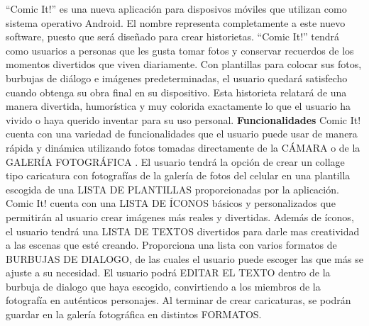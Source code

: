 \documentclass[12pt]{report}
\begin{document}
``Comic It!'' es una nueva aplicación para disposivos móviles que utilizan como sistema operativo Android. El nombre representa completamente a este nuevo software, puesto que será diseñado para crear historietas.
\newline
\newline
``Comic It!'' tendrá como usuarios a personas que les gusta tomar fotos y conservar recuerdos de los momentos divertidos que viven diariamente.
\newline
\newline
Con plantillas para colocar sus fotos, burbujas de diálogo e imágenes predeterminadas, el usuario quedará satisfecho cuando obtenga su obra final en su dispositivo.
\newline
\newline
Esta historieta relatará de una manera divertida, humorística y muy colorida exactamente lo que el usuario ha vivido o haya querido inventar para su uso personal.
	\newline
	\newline
	\newline
	\begingroup
		\large{
			\textbf{
				Funcionalidades
				\newline
				\newline
			}
		}
	\endgroup
\newline
Comic It! cuenta con una variedad de funcionalidades que el usuario puede usar de manera rápida y dinámica utilizando 				fotos tomadas directamente de la CÁMARA o de la GALERÍA FOTOGRÁFICA .
\newline
\newline
El usuario tendrá la opción de crear un collage tipo caricatura  con fotografías de la galería de fotos del celular en una plantilla escogida de una LISTA DE PLANTILLAS proporcionadas por la aplicación.
\newline
\newline
Comic It! cuenta con una LISTA DE ÍCONOS básicos y personalizados que permitirán al usuario crear imágenes más reales y divertidas.	
\newline
\newline	
Además de íconos, el usuario tendrá una LISTA DE TEXTOS divertidos para darle mas creatividad a las escenas que esté creando.
\newline
\newline
Proporciona una lista con varios formatos de BURBUJAS DE DIALOGO, de las cuales el usuario puede escoger las que más se ajuste a su necesidad. El usuario podrá EDITAR EL TEXTO dentro de la burbuja de dialogo que haya escogido, convirtiendo a los miembros de 		la fotografía en auténticos personajes.
\newline
\newline
Al terminar de crear caricaturas, se podrán guardar en la galería fotográfica en distintos FORMATOS.
\end{document}
